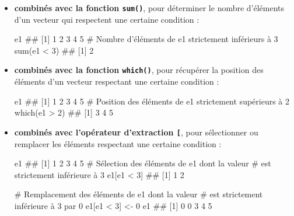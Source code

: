 \documentclass[12pt,twosided, notitlepage]{book}
\newenvironment{Shaded}{}{}
\newcommand{\KeywordTok}[1]{\textcolor[rgb]{0.00,0.00,1.00}{#1}}
\newcommand{\DecValTok}[1]{#1}
\newcommand{\StringTok}[1]{\textcolor[rgb]{0.00,0.50,0.50}{#1}}
\newcommand{\CommentTok}[1]{\textcolor[rgb]{0.00,0.50,0.00}{#1}}
\newcommand{\OperatorTok}[1]{#1}
\newcommand{\NormalTok}[1]{#1}
\renewenvironment{Shaded}{\begin{snugshade}}{\end{snugshade}}
\begin{document}
\begin{itemize}
\item
  \textbf{combinés avec la fonction \texttt{sum()}},
  pour déterminer le nombre d'éléments d'un vecteur qui respectent une
  certaine condition :

\begin{Shaded}
\begin{Highlighting}[]
\NormalTok{e1}
\NormalTok{  ## [1] 1 2 3 4 5}
\CommentTok{# Nombre d'éléments de e1 strictement inférieurs à 3}
\KeywordTok{sum}\NormalTok{(e1 }\OperatorTok{<}\StringTok{ }\DecValTok{3}\NormalTok{)}
\NormalTok{  ## [1] 2}
\end{Highlighting}
\end{Shaded}
\item
  \textbf{combinés avec la fonction
  \texttt{which()}}, pour récupérer la
  position des éléments d'un vecteur respectant une certaine condition :

\begin{Shaded}
\begin{Highlighting}[]
\NormalTok{e1}
\NormalTok{  ## [1] 1 2 3 4 5}
\CommentTok{# Position des éléments de e1 strictement supérieurs à 2}
\KeywordTok{which}\NormalTok{(e1 }\OperatorTok{>}\StringTok{ }\DecValTok{2}\NormalTok{)}
\NormalTok{  ## [1] 3 4 5}
\end{Highlighting}
\end{Shaded}
\item
  \textbf{combinés avec l'opérateur d'extraction
  \texttt{{[}}}\index{\texttt{[}}, pour sélectionner ou remplacer les
  éléments respectant une certaine condition :

\begin{Shaded}
\begin{Highlighting}[]
\NormalTok{e1}
\NormalTok{  ## [1] 1 2 3 4 5}
\CommentTok{# Sélection des éléments de e1 dont la valeur }
\CommentTok{# est strictement inférieure à 3}
\NormalTok{e1[e1 }\OperatorTok{<}\StringTok{ }\DecValTok{3}\NormalTok{]}
\NormalTok{  ## [1] 1 2}

\CommentTok{# Remplacement des éléments de e1 dont la valeur }
\CommentTok{# est strictement inférieure à 3 par 0}
\NormalTok{e1[e1 }\OperatorTok{<}\StringTok{ }\DecValTok{3}\NormalTok{] <-}\StringTok{ }\DecValTok{0}
\NormalTok{e1}
\NormalTok{  ## [1] 0 0 3 4 5}
\end{Highlighting}
\end{Shaded}
\end{itemize}
\end{document}

